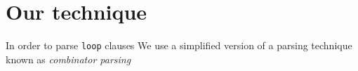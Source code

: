 \section{Our technique}

In order to parse \texttt{loop} clauses We use a simplified version of
a parsing technique known as \emph{combinator parsing}
\cite{Wadler:1985:RFL:5280.5288}

